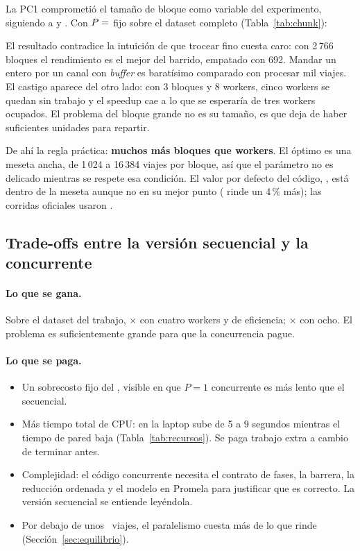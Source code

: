 La PC1 comprometió el tamaño de bloque como variable del experimento, siguiendo a
\textcite{kwedlo2021} y \textcite{kwedlo2024}. Con $P = \cifra{p-chunk}$ fijo sobre el dataset
completo (Tabla~\ref{tab:chunk}):



El resultado contradice la intuición de que trocear fino cuesta caro: con 2\,766 bloques el
rendimiento es el mejor del barrido, empatado con 692. Mandar un entero por un canal con
\emph{buffer} es baratísimo comparado con procesar mil viajes. El castigo aparece del otro lado: con
3 bloques y 8 workers, cinco workers se quedan sin trabajo y el speedup cae a lo que se esperaría de
tres workers ocupados. El problema del bloque grande no es su tamaño, es que deja de haber
suficientes unidades para repartir.

De ahí la regla práctica: \textbf{muchos más bloques que workers}. El óptimo es una meseta ancha,
de 1\,024 a 16\,384 viajes por bloque, así que el parámetro no es delicado mientras se respete esa
condición. El valor por defecto del código, , está dentro de la meseta aunque no en su
mejor punto ( rinde un 4\,\% más); las corridas oficiales usaron .

\subsection{Trade-offs entre la versión secuencial y la concurrente}

\paragraph{Lo que se gana.} Sobre el dataset del trabajo, $\times$ con cuatro
workers y  de eficiencia; $\times$ con ocho. El problema es
suficientemente grande para que la concurrencia pague.

\paragraph{Lo que se paga.}
\begin{itemize}
  \item Un sobrecosto fijo del , visible en que $P = 1$ concurrente es más
        lento que el secuencial.
  \item Más tiempo total de CPU: en la laptop sube de 5 a 9 segundos mientras el tiempo de pared
        baja (Tabla~\ref{tab:recursos}). Se paga trabajo extra a cambio de terminar antes.
  \item Complejidad: el código concurrente necesita el contrato de fases, la barrera, la reducción
        ordenada y el modelo en Promela para justificar que es correcto. La versión secuencial se
        entiende leyéndola.
  \item Por debajo de unos ~viajes, el paralelismo cuesta más de lo que rinde
        (Sección~\ref{sec:equilibrio}).
\end{itemize}

